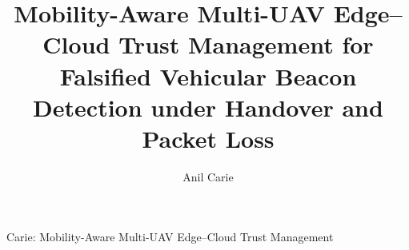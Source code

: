 \documentclass[journal]{IEEEtran}
\begin{document}
%
\title{Mobility-Aware Multi-UAV Edge--Cloud Trust Management for Falsified Vehicular Beacon Detection under Handover and Packet Loss}
%
%
\author{
Anil Carie\\
}



%
{Carie: Mobility-Aware Multi-UAV Edge--Cloud Trust Management}
% 











\maketitle
\end{document}
